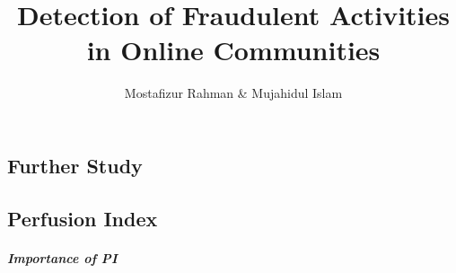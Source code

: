 \documentclass[12pt]{report}
\title{Detection of  Fraudulent Activities in Online Communities}
\author{Mostafizur Rahman \& Mujahidul Islam}
\newlength{\defbaselineskip}
\newcommand{\setlinespacing}[1]%
           {\setlength{\baselineskip}{#1 \defbaselineskip}}
\theoremstyle{plain}
\theoremstyle{definition}
\theoremstyle{remark}
\numberwithin{equation}{section}
\begin{document}
{
\beforepreface
{} %
}
{

}
{

}
\afterpreface
\def\baselinestretch{1}
\setlinespacing{1.66}
{


}
\setlinespacing{1.66}

%
%
%
%
%
\begin{appendices}
\chapter{Further Study}
\section{Perfusion Index}


\paragraph{Importance of PI}

\end{appendices}

\setlinespacing{1.44}


%  
\printindex
\end{document}

